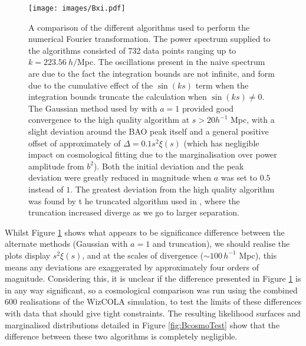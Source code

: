 \documentclass[titlesmallcaps, examinerscopy, copyrightpage]{uqthesis}
\begin{document}
\begin{appendices}
\begin{figure}[h!]
  \begin{center}
    \texttt{[image: images/Bxi.pdf]}
  \end{center}
  \caption{A comparison of the different algorithms used to perform the numerical Fourier transformation. The power spectrum supplied to the algorithms consisted of 732 data points ranging up to $k = 223.56 \ h/$Mpc. The oscillations present in the naive spectrum are due to the fact the integration bounds are not infinite, and form due to the cumulative effect of the $\sin(ks)$ term when the integration bounds truncate the calculation when $\sin(ks) \neq 0$. The Gaussian method used by \citet{AndersonAubourg2012} with $a=1$ provided good convergence to the high quality algorithm at $s > 20 h^{-1}$ Mpc, with a slight deviation around the BAO peak itself and a general positive offset of approximately of $\Delta = 0.1 s^2 \xi(s)$ (which has negligible impact on cosmological fitting due to the marginalisation over power amplitude from $b^2$). Both the initial deviation and the peak deviation were greatly reduced in magnitude when $a$ was set to $0.5$ instead of $1$. The greatest deviation from the high quality algorithm was found by t he truncated algorithm used in \citet{BlakeDavis2011}, where the truncation increased diverge as we go to larger separation.}
  \label{fig:pk2xicomp}
\end{figure}

Whilst Figure \ref{fig:pk2xicomp} shows what appears to be significance difference between the alternate methods (Gaussian with $a=1$ and truncation), we should realise the plots display $s^2 \xi(s)$, and at the scales of divergence ($\sim 100\, h^{-1}$ Mpc), this means any deviations are exaggerated by approximately four orders of magnitude. Considering this, it is unclear if the difference presented in Figure \ref{fig:pk2xicomp} is in any way significant, so a cosmological comparison was run using the combined 600 realisations of the WizCOLA simulation, to test the limits of these differences with data that should give tight constraints. The resulting likelihood surfaces and marginalised distributions detailed in Figure \ref{fig:BcosmoTest} show that the difference between these two algorithms is completely negligible.


\end{appendices}
\end{document}
